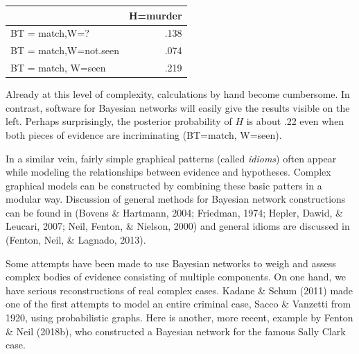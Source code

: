 \documentclass[11pt,dvipsnames,enabledeprecatedfontcommands]{scrartcl}
\begin{document}
\vspace{1mm}

\begin{minipage}[c]{0.4\linewidth}
\begin{tabular}{lr}
\toprule
  & H=murder\\
\midrule
BT = match,W=? & .138\\
BT = match,W=not.seen & .074\\
BT = match, W=seen & .219\\
\bottomrule
\end{tabular}
\end{minipage}\begin{minipage}[c]{0.575\linewidth}
Already at this level of complexity, calculations by hand become cumbersome. In contrast,  software for Bayesian networks  will easily give the results visible on the left. Perhaps surprisingly, the posterior probability of $H$ is about .22 even when both pieces of evidence are incriminating (BT=match, W=seen).
\end{minipage}

\vspace{2mm}

In a similar vein, fairly simple graphical patterns (called
\emph{idioms}) often appear while modeling the relationships between
evidence and hypotheses. Complex graphical models can be constructed by
combining these basic patters in a modular way. Discussion of general
methods for Bayesian network constructions can be found in (Bovens \&
Hartmann, 2004; Friedman, 1974; Hepler, Dawid, \& Leucari, 2007; Neil,
Fenton, \& Nielson, 2000) and general idioms are discussed in (Fenton,
Neil, \& Lagnado, 2013).

Some attempts have been made to use Bayesian networks to weigh and
assess complex bodies of evidence consisting of multiple components. On
one hand, we have serious reconstructions of real complex cases. Kadane
\& Schum (2011) made one of the first attempts to model an entire
criminal case, Sacco \& Vanzetti from 1920, using probabilistic graphs.
Here is another, more recent, example by Fenton \& Neil (2018b), who
constructed a Bayesian network for the famous Sally Clark case.

\noindent
\end{document}
